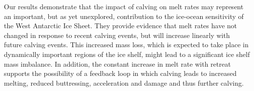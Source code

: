 \documentclass[draft]{agujournal2019}
\begin{document}
Our results demonstrate that the impact of calving on melt rates may represent an important, but as yet unexplored, contribution to the ice-ocean sensitivity of the West Antarctic Ice Sheet. They provide evidence that melt rates have not changed in response to recent calving events, but will increase linearly with future calving events. This increased mass loss, which is expected to take place in dynamically important regions of the ice shelf, might lead to a significant ice shelf mass imbalance. In addition, the constant increase in melt rate with retreat supports the possibility of a feedback loop in which calving leads to increased melting, reduced buttressing, acceleration and damage and thus further calving.




%
\end{document}
